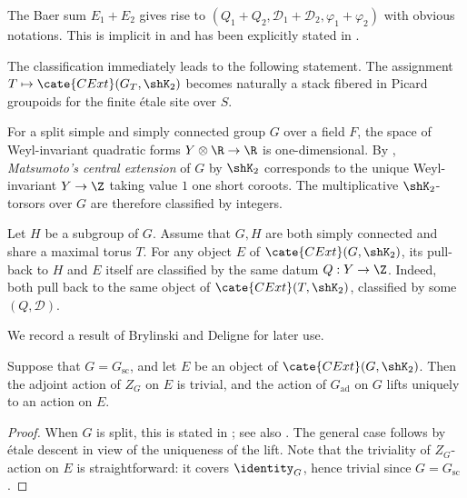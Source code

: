 \documentclass[a4paper,10pt]{article}
\begin{document}
\begin{asparaenum}[\bfseries (A)]
	\item The Baer sum $E_1 + E_2$ gives rise to $(Q_1 + Q_2, \mathcal{D}_1 + \mathcal{D}_2, \varphi_1 + \varphi_2)$ with obvious notations. This is implicit in \cite{BD01} and has been explicitly stated in \cite[Theorem 2.2]{Weis16}.
\end{asparaenum}

The classification immediately leads to the following statement. The assignment $T \mapsto \cate{CExt}(G_T, \shK_2)$ becomes naturally a stack fibered in Picard groupoids for the finite étale site over $S$.

\begin{remark}\label{rem:Matsumoto}
	For a split simple and simply connected group $G$ over a field $F$, the space of Weyl-invariant quadratic forms $Y \otimes \R \to \R$ is one-dimensional. By \cite[Proposition 4.15]{BD01}, \emph{Matsumoto's central extension} \cite{Mat69} of $G$ by $\shK_2$ corresponds to the unique Weyl-invariant $Y \to \Z$ taking value $1$ one short coroots. The multiplicative $\shK_2$-torsors over $G$ are therefore classified by integers.
\end{remark}

\begin{remark}\label{rem:shared-torus}
	Let $H$ be a subgroup of $G$. Assume that $G,H$ are both simply connected and share a maximal torus $T$. For any object $E$ of $\cate{CExt}(G, \shK_2)$, its pull-back to $H$ and $E$ itself are classified by the same datum $Q: Y \to \Z$. Indeed, both pull back to the same object of $\cate{CExt}(T, \shK_2)$, classified by some $(Q, \mathcal{D})$.
\end{remark}

We record a result of Brylinski and Deligne for later use.
\begin{proposition}\label{prop:BD-adjoint-action}
	Suppose that $G = G_\mathrm{sc}$, and let $E$ be an object of $\cate{CExt}(G, \shK_2)$. Then the adjoint action of $Z_G$ on $E$ is trivial, and the action of $G_\mathrm{ad}$ on $G$ lifts uniquely to an action on $E$.
\end{proposition}
\begin{proof}
	When $G$ is split, this is stated in \cite[4.10]{BD01}; see also \cite[Proposition 5.13]{Mat69}. The general case follows by étale descent in view of the uniqueness of the lift. Note that the triviality of $Z_G$-action on $E$ is straightforward: it covers $\identity_G$, hence trivial since $G = G_\text{sc}$.
\end{proof}
\end{document}

